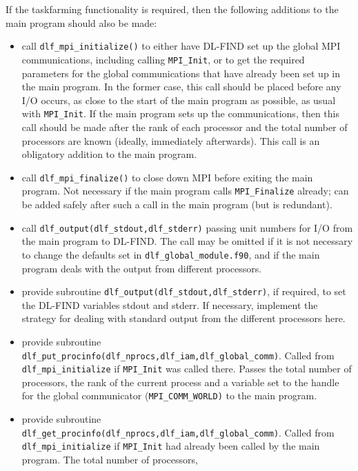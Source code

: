 \documentclass{article}
\begin{document}
If the taskfarming functionality is required, then the following additions to the 
main program should also be made:
\begin{itemize}
\item call \texttt{dlf\_mpi\_initialize()} to either have DL-FIND set up the global MPI communications, 
      including calling 
      \texttt{MPI\_Init}, or to get the required parameters for the global communications that have 
      already been set up in the 
      main program.  In the former case, this call should be placed before any 
      I/O occurs, as close to the start of the main program as possible, as 
      usual with \texttt{MPI\_Init}.  If the main program sets up the communications, then this 
      call should be made after the rank of each processor and the total number of processors are known 
      (ideally, immediately afterwards).
      This call is an obligatory addition to the main program.
\item call \texttt{dlf\_mpi\_finalize()} to close down MPI before exiting the main program.
      Not necessary if the main program calls \texttt{MPI\_Finalize} already; can be added 
      safely after such a call in the main program (but is redundant).
\item call \texttt{dlf\_output(dlf\_stdout,dlf\_stderr)} passing unit numbers for I/O from 
      the main program to DL-FIND.  The call may be omitted if it is not necessary to change 
      the defaults set in \texttt{dlf\_global\_module.f90}, and if the main program deals with 
      the output from different processors.
\item provide subroutine \texttt{dlf\_output(dlf\_stdout,dlf\_stderr)}, if required, to set 
      the DL-FIND variables stdout 
      and stderr.  If necessary, implement the strategy for dealing with standard output from the 
      different processors here.
\item provide subroutine \texttt{dlf\_put\_procinfo(dlf\_nprocs,dlf\_iam,dlf\_global\_comm)}. 
      Called from \texttt{dlf\_mpi\_initialize} if \texttt{MPI\_Init} was called there.  Passes the 
      total number of processors, 
      the rank of the current process and a variable set to the handle for the 
      global communicator (\texttt{MPI\_COMM\_WORLD)} to the main program. 
\item provide subroutine \texttt{dlf\_get\_procinfo(dlf\_nprocs,dlf\_iam,dlf\_global\_comm)}. 
      Called from \texttt{dlf\_mpi\_initialize} if \texttt{MPI\_Init} had already been called by the 
      main program.  The total number of processors, 

\end{itemize}
\end{document}
